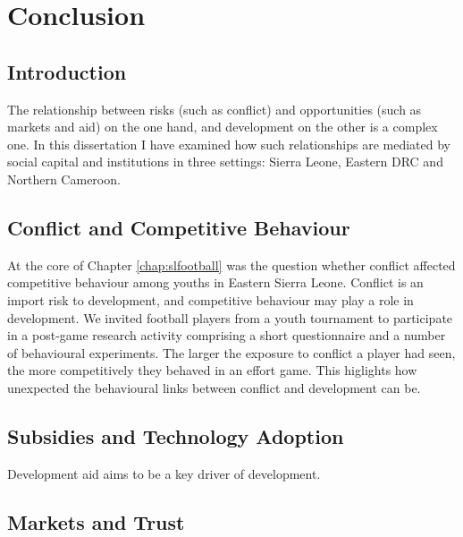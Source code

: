\chapter{Conclusion}
\label{chap:conclusion}

\section{Introduction}
The relationship between risks (such as conflict) and opportunities (such as markets and aid) on the one hand, and development on the other is a complex one. In this dissertation I have examined how such relationships are mediated by social capital and institutions in three settings: Sierra Leone, Eastern DRC and Northern Cameroon.





\section{Conflict and Competitive Behaviour}

At the core of Chapter \ref{chap:slfootball} was the question whether conflict affected competitive behaviour among youths in Eastern Sierra Leone. Conflict is an import risk to development, and competitive behaviour may play a role in development. We invited football players from a youth tournament to participate in a post-game research activity comprising a short questionnaire and a number of behavioural experiments. The larger the exposure to conflict a player had seen, the more competitively they behaved in an effort game. This higlights how unexpected the behavioural links between conflict and development can be.



\section{Subsidies and Technology Adoption}
Development aid aims to be a key driver of development.


\section{Markets and Trust}

